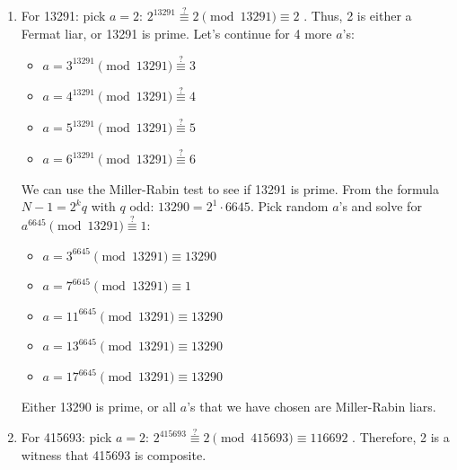 {\begin{enumerate}
\begin{itemize}
\begin{align*}
                    k_0 &= 2813 \pmod{8911} \\
                    k_1 &= 2813^2 \pmod{8911} \equiv 1 \\
                    k_2 &= 1^2 \pmod{8911} \equiv 1 \\
                    &\vdots
                \end{align*} Since we did not have any result of \(a^{2^k \cdot q} = N - 1\), 8911 is not prime with 5 as a Miller-Rabin witness.
              \end{itemize} \text{ \textcolor{red}{diff ans}}
        \item For 13291: pick \(a = 2\): \(2^{13291} \stackrel{?}{\equiv} 2 \pmod{13291} \equiv 2\) \cmark. Thus, 2 is either a Fermat liar, or 13291 is prime. Let's continue for 4 more \(a\)'s:
              \begin{itemize}
                  \item \(a = 3^{13291} \pmod{13291} \stackrel{?}{\equiv} 3\)\ \cmark%
                  \item \(a = 4^{13291} \pmod{13291} \stackrel{?}{\equiv} 4\)\ \cmark%
                  \item \(a = 5^{13291} \pmod{13291} \stackrel{?}{\equiv} 5\)\ \cmark%
                  \item \(a = 6^{13291} \pmod{13291} \stackrel{?}{\equiv} 6\)\ \cmark%
              \end{itemize}
              We can use the Miller-Rabin test to see if 13291 is prime. From the formula \(N - 1 = 2^kq\) with \(q\) odd: \(13290 = 2^1 \cdot 6645\). Pick random \(a\)'s and solve for \(a^{6645} \pmod{13291} \stackrel{?}{\equiv} 1\):
              \begin{itemize}
                  \item \(a = 3^{6645} \pmod{13291} \equiv 13290\)\ \cmark%
                  \item \(a = 7^{6645} \pmod{13291} \equiv 1\)\ \cmark%
                  \item \(a = 11^{6645} \pmod{13291} \equiv 13290\)\ \cmark%
                  \item \(a = 13^{6645} \pmod{13291} \equiv 13290\)\ \cmark%
                  \item \(a = 17^{6645} \pmod{13291} \equiv 13290\)\ \cmark%
              \end{itemize} Either 13290 is prime, or all \(a\)'s that we have chosen are Miller-Rabin liars.
        \item For 415693: pick \(a = 2\): \(2^{415693} \stackrel{?}{\equiv} 2 \pmod{415693} \equiv 116692\) \xmark. Therefore, 2 is a witness that 415693 is composite.
    \end{enumerate}
}




